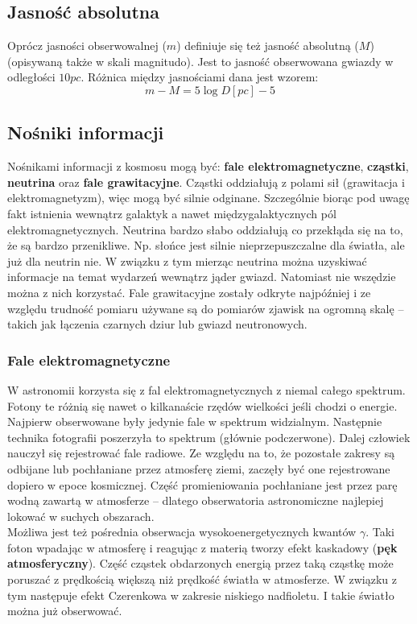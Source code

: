 \documentclass[../index.tex]{subfiles}
\begin{document}
        \subsection{Jasność absolutna}
            Oprócz jasności obserwowalnej (\(m\)) definiuje się też jasność absolutną (\(M\)) (opisywaną także w skali magnitudo). Jest to jasność obserwowana gwiazdy w odległości \(10 pc\). Różnica między jasnościami dana jest wzorem:
            \begin{equation}
                m - M = 5 \log D[pc] - 5
            \end{equation}
        \subsection{Nośniki informacji}
            Nośnikami informacji z kosmosu mogą być: \textbf{fale elektromagnetyczne}, \textbf{cząstki}, \textbf{neutrina} oraz \textbf{fale grawitacyjne}. Cząstki oddziałują z polami sił (grawitacja i elektromagnetyzm), więc mogą być silnie odginane. Szczególnie biorąc pod uwagę fakt istnienia wewnątrz galaktyk a nawet międzygalaktycznych pól elektromagnetycznych. Neutrina bardzo słabo oddziałują co przekłąda się na to, że są bardzo przenikliwe. Np. słońce jest silnie nieprzepuszczalne dla światła, ale już dla neutrin nie. W związku z tym mierząc neutrina można uzyskiwać informacje na temat wydarzeń wewnątrz jąder gwiazd. Natomiast nie wszędzie można z nich korzystać. Fale grawitacyjne zostały odkryte najpóźniej i ze względu trudność pomiaru używane są do pomiarów zjawisk na ogromną skalę \--- takich jak łączenia czarnych dziur lub gwiazd neutronowych.
            \subsubsection{Fale elektromagnetyczne}
                W astronomii korzysta się z fal elektromagnetycznych z niemal całego spektrum. Fotony te różnią się nawet o kilkanaście rzędów wielkości jeśli chodzi o energie. Najpierw obserwowane były jedynie fale w spektrum widzialnym. Następnie technika fotografii poszerzyła to spektrum (głównie podczerwone). Dalej człowiek nauczył się rejestrować fale radiowe. Ze względu na to, że pozostałe zakresy są odbijane lub pochłaniane przez atmosferę ziemi, zaczęły być one rejestrowane dopiero w epoce kosmicznej. Część promieniowania pochłaniane jest przez parę wodną zawartą w atmosferze \--- dlatego obserwatoria astronomiczne najlepiej lokować w suchych obszarach.\\
                Możliwa jest też pośrednia obserwacja wysokoenergetycznych kwantów \(\gamma\). Taki foton wpadając w atmosferę i reagując z materią tworzy efekt kaskadowy (\textbf{pęk atmosferyczny}). Część cząstek obdarzonych energią przez taką cząstkę może poruszać z prędkością większą niż prędkość światła w atmosferze. W związku z tym następuje efekt Czerenkowa w zakresie niskiego nadfioletu. I takie światło można już obserwować.
\end{document}

